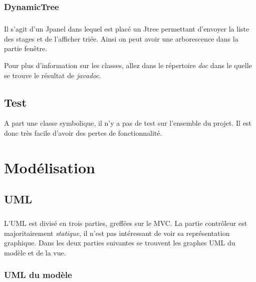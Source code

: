 \documentclass[a4paper,10pt]{report}
\begin{document}
		\subsection{DynamicTree}

			\paragraph*{}
			Il s'agit d'un Jpanel dans lequel est placé un Jtree permettant d'envoyer la liste des stages et de l'afficher triée.
			Ainsi on peut avoir une arborescence dans la partie fenêtre.

		Pour plus d'information sur les classes, allez dans le répertoire \textit{doc} dans le quelle se trouve le résultat de \textit{javadoc}.

	\section{Test}

		 A part une classe symbolique, il n'y a pas de test sur l’ensemble du projet. Il est donc très facile d'avoir des pertes de fonctionnalité.

\chapter{Modélisation}

	\section{UML}

		\paragraph*{}
		L'UML est divisé en trois parties, greffées sur le MVC. La partie contrôleur est majoritairement \textit{statique}, il n'est pas intéressant de voir sa représentation graphique. Dans les deux parties suivantes se trouvent les graphes UML du modèle et de la vue.

		\subsection{UML du modèle}
\end{document}
